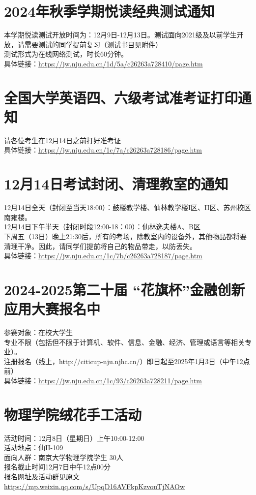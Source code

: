 \documentclass[letterpaper, 12pt]{article}
\begin{document}
\begin{multicols}{2}
\section{2024年秋季学期悦读经典测试通知}
本学期悦读测试开放时间为：12月9日-12月13日。测试面向2021级及以前学生开放，请需要测试的同学提前复习（测试书目见附件）\\
测试形式为在线网络测试，时长60分钟。\\
具体链接：\url{https://jw.nju.edu.cn/1d/5a/c26263a728410/page.htm}\\

\section{全国大学英语四、六级考试准考证打印通知}
请各位考生在12月14日之前打好准考证\\
具体链接：\url{https://jw.nju.edu.cn/1c/7a/c26263a728186/page.htm}\\

\section{12月14日考试封闭、清理教室的通知}
12月14日全天（封闭至当天18:00）：鼓楼教学楼、仙林教学楼I区、II区、苏州校区南雍楼。\\
12月14日下午半天（封闭时段12:00-18：00）：仙林逸夫楼A、B区\\
下周五（13日）晚上21:30后，所有的考场，除教室内的设备外，其他物品都将要清理干净。因此，请同学们提前将自己的物品带走，以防丢失。\\
具体链接：\url{https://jw.nju.edu.cn/1c/7b/c26263a728187/page.htm}

\section{2024-2025第二十届 “花旗杯”金融创新应用大赛报名中}
参赛对象：在校大学生\\
专业不限（包括但不限于计算机、软件、信息、金融、经济、管理或语言等相关专业）。\\
注册报名（线上，http://citicup-nju.njhc.cn/）即日起至2025年1月3日（中午12点前）\\
具体链接：\url{https://jw.nju.edu.cn/1c/93/c26263a728211/page.htm}\\

\section{物理学院绒花手工活动}
活动时间：12月8日（星期日）上午10:00-12:00\\
活动地点：仙II-109\\
面向人群：南京大学物理学院学生 30人\\
报名截止时间12月7日中午12点00分\\
报名网址及活动群见原文\url{https://mp.weixin.qq.com/s/UpqD16AVFkpKzvouTjNAOw}


\end{multicols}
\end{document}
